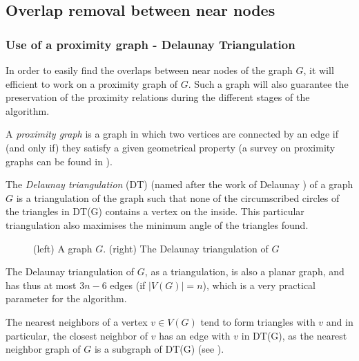 \documentclass[12pt]{report}
\begin{document}
\subsection{Overlap removal between near nodes}

\subsubsection{Use of a proximity graph - Delaunay Triangulation}

In order to easily find the overlaps between near nodes of the graph $G$, it will efficient to work on a proximity graph of $G$. Such a graph will also guarantee the preservation of the proximity relations during the different stages of the algorithm.

A \emph{proximity graph} is a graph in which two vertices are connected by an edge if (and only if) they satisfy a given geometrical property (a survey on proximity graphs can be found in \cite{JT92}).

\bigskip
The \emph{Delaunay triangulation} (DT) (named after the work of Delaunay \cite{Delaunay34}) of a graph $G$ is a triangulation of the graph such that none of the circumscribed circles of the triangles in DT(G) contains a vertex on the inside. This particular triangulation also maximises the minimum angle of the triangles found.

\begin{figure}[h]
	\center
  \setlength\fboxsep{5pt}
  \setlength\fboxrule{0.5pt}
  \caption{(left) A graph $G$. (right) The Delaunay triangulation of $G$}
  \label{DT}
\end{figure}

The Delaunay triangulation of $G$, as a triangulation, is also a planar graph, and has thus at most $3n -6$ edges (if $|V(G)| = n$), which is a very practical parameter for the algorithm.

\bigskip
The nearest neighbors of a vertex $v \in V(G)$ tend to form triangles with $v$ and in particular, the closest neighbor of $v$ has an edge with $v$ in DT(G), as the nearest neighbor graph of $G$ is a subgraph of DT(G) (see \cite{JT92}).
\end{document}

